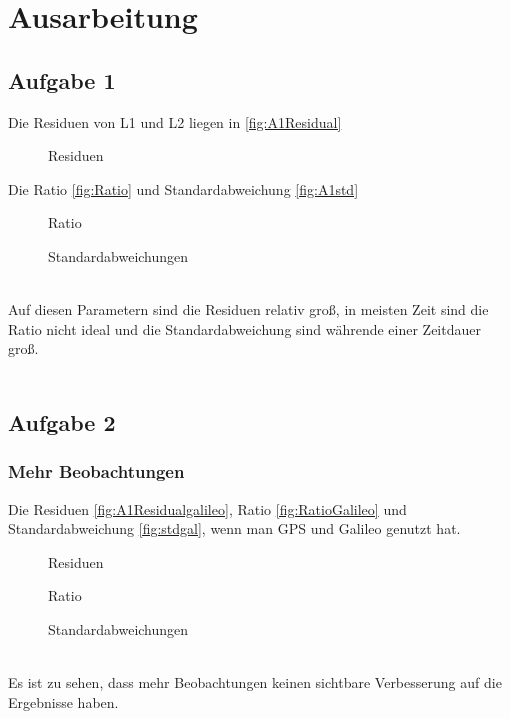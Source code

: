 \chapter{Ausarbeitung}
\section{Aufgabe 1}
Die Residuen von L1 und L2 liegen in \autoref{fig:A1Residual}
\begin{figure}[ht]\centering 
	\caption{Residuen}
	\label{fig:A1Residual}
\end{figure}
\clearpage
Die Ratio \autoref{fig:Ratio} und Standardabweichung \autoref{fig:A1std}
\begin{figure}[ht]\centering 
	\caption{Ratio}
	\label{fig:Ratio}
\end{figure}
\begin{figure}[ht]\centering 
	\caption{Standardabweichungen}
	\label{fig:A1std}
\end{figure}\\
Auf diesen Parametern sind die Residuen relativ groß, in meisten Zeit sind die Ratio nicht ideal und die Standardabweichung sind währende einer Zeitdauer groß. \\\\
\clearpage
\section{Aufgabe 2}
\subsection{Mehr Beobachtungen}
Die Residuen \autoref{fig:A1Residualgalileo}, Ratio \autoref{fig:RatioGalileo} und Standardabweichung \autoref{fig:stdgal}, wenn man GPS und Galileo genutzt hat.
\begin{figure}[ht]\centering  
\caption{Residuen}
\label{fig:A1Residualgalileo}
\end{figure}
\begin{figure}[ht]\centering 
	\caption{Ratio}
	\label{fig:RatioGalileo}
\end{figure}
\begin{figure}[ht]\centering 
	\caption{Standardabweichungen}
	\label{fig:stdgal}
\end{figure}\\
Es ist zu sehen, dass mehr Beobachtungen keinen sichtbare Verbesserung auf die Ergebnisse haben.
\newpage
